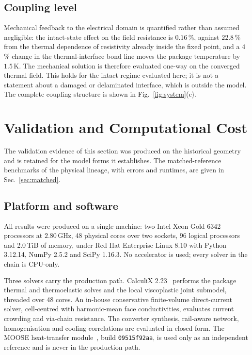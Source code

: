\documentclass[journal]{IEEEtran}
\begin{document}
\subsection{Coupling level}
Mechanical feedback to the electrical domain is quantified rather than assumed negligible:
the intact-state effect on the field resistance is $0.16$\,\%, against $22.8$\,\% from the
thermal dependence of resistivity already inside the fixed point, and a $4$\,\% change in the
thermal-interface bond line moves the package temperature by $1.5$\,K. The mechanical
solution is therefore evaluated one-way on the converged thermal field. This holds for the
intact regime evaluated here; it is not a statement about a damaged or delaminated interface,
which is outside the model. The complete coupling structure is shown in
Fig.~\ref{fig:system}(c).
\section{Validation and Computational Cost}\label{sec:valid}
The validation evidence of this section was produced on the historical geometry and is
retained for the model forms it establishes. The matched-reference benchmarks of the
physical lineage, with errors and runtimes, are given in Sec.~\ref{sec:matched}.

\subsection{Platform and software}
All results were produced on a single machine: two Intel Xeon Gold 6342 processors at
$2.80$\,GHz, 48 physical cores over two sockets, 96 logical processors and 2.0\,TiB of
memory, under Red Hat Enterprise Linux 8.10 with Python 3.12.14, NumPy 2.5.2 and SciPy
1.16.3. No accelerator is used; every solver in the chain is CPU-only.

Three solvers carry the production path. CalculiX 2.23~\cite{CalculiX} performs the
package thermal and
thermoelastic solves and the local viscoplastic joint submodel, threaded over 48 cores. An
in-house conservative finite-volume direct-current solver, cell-centred with harmonic-mean
face conductivities, evaluates current crowding and via-chain resistance. The converter
synthesis, rail-aware network, homogenisation and cooling correlations are evaluated in
closed form. The MOOSE heat-transfer module~\cite{MOOSE}, build \texttt{09515f92aa}, is
used only as an
independent reference and is never in the production path.
\end{document}
